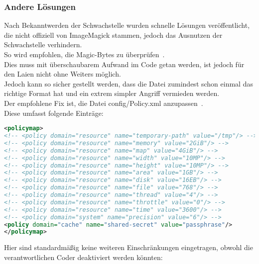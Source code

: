 \subsubsection{Andere Lösungen}

Nach Bekanntwerden der Schwachstelle wurden schnelle Lösungen veröffentlicht, die nicht offiziell von ImageMagick stammen, jedoch das Ausnutzen der Schwachstelle verhindern.\\

So wird empfohlen, die Magic-Bytes zu überprüfen~\cite{ImageTragick}.\\
Dies muss mit überschaubarem Aufwand im Code getan werden, ist jedoch für den Laien nicht ohne Weiters möglich.\\
Jedoch kann so sicher gestellt werden, dass die Datei zumindest schon einmal das richtige Format hat und ein extrem simpler Angriff vermieden werden.\\

Der empfohlene Fix ist,  die Datei config/Policy.xml anzupassen~\cite{ImageTragick}.\\
Diese umfasst folgende Einträge:\\

\begin{lstlisting}[firstnumber=47, language=XML, caption=config/Policy.xml Inhalt,label={lst:lstlisting}]
<policymap>
<!-- <policy domain="resource" name="temporary-path" value="/tmp"/> -->
<!-- <policy domain="resource" name="memory" value="2GiB"/> -->
<!-- <policy domain="resource" name="map" value="4GiB"/> -->
<!-- <policy domain="resource" name="width" value="10MP"/> -->
<!-- <policy domain="resource" name="height" value="10MP"/> -->
<!-- <policy domain="resource" name="area" value="1GB"/> -->
<!-- <policy domain="resource" name="disk" value="16EB"/> -->
<!-- <policy domain="resource" name="file" value="768"/> -->
<!-- <policy domain="resource" name="thread" value="4"/> -->
<!-- <policy domain="resource" name="throttle" value="0"/> -->
<!-- <policy domain="resource" name="time" value="3600"/> -->
<!-- <policy domain="system" name="precision" value="6"/> -->
<policy domain="cache" name="shared-secret" value="passphrase"/>
</policymap>
\end{lstlisting}
\vspace{5mm}

Hier sind standardmäßig keine weiteren Einschränkungen eingetragen, obwohl die verantwortlichen Coder deaktiviert werden könnten:\\

